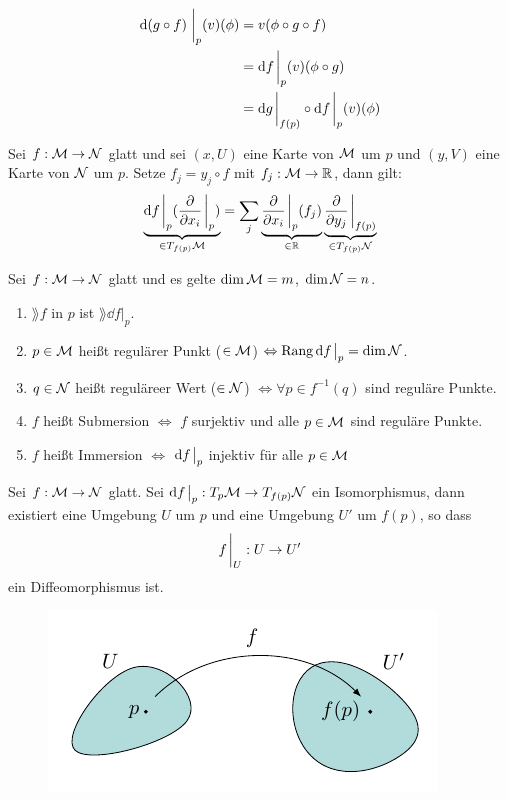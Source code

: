 \begin{bew} \leavevmode
\begin{align}
\dd (g \circ f) \eval_{p} (v) (\phi) &= v(\phi \circ g \circ f) \\
&= \dd f \eval_p (v)(\phi \circ g) \\
&= \dd g \eval_{f(p)} \circ \dd f \eval_p (v) (\phi)
\end{align}
\end{bew}

\begin{satz}
Sei $f: \mathcal{M} \to \mathcal{N}$ glatt und sei $(x, U)$ eine Karte von $\mathcal{M}$ um $p$ und $(y, V)$ eine Karte von $\mathcal{N}$ um $p$.
Setze $f_j = y_j \circ f$ mit $f_j : \mathcal{M} \to \mathbb{R}$, dann gilt:
\begin{align}
\underbrace{\dd f \eval_p ( \pdv{x_i} \eval_p)}_{\in T_{f(p)}\mfk} = \sum_j \underbrace{\pdv{x_i}\eval_p (f_j)}_{\in \R} \underbrace{\pdv{y_j} \eval_{f(p)}}_{\in T_{f(p)}\mfka}
\end{align}
\end{satz}

\begin{defs} 
Sei $f: \mathcal{M} \to \mathcal{N}$ glatt und es gelte $\dim\mathcal{M}=m$, $\dim{\mathcal{N}} = n$.
\begin{enumerate}
\item $\rang f$ in $p$ ist $\rang \dd f \big \vert_p $.
\item $p\in\mathcal{M}$ heißt regulärer Punkt ($\in\mathcal{M}$)  $\Leftrightarrow \rang\dd f \eval_p=\dim\mfka$.
\item $q\in\mathcal{N}$ heißt reguläreer Wert ($\in\mathcal{N}$) $\Leftrightarrow \forall p \in f	^{-1}(q)$ sind reguläre Punkte.
\item $f$ heißt Submersion $\Leftrightarrow$ $f$ surjektiv und alle $p\in\mathcal{M}$ sind reguläre Punkte.
\item $f$ heißt Immersion $\Leftrightarrow$ $\dd f \eval_p$ injektiv für alle $p \in \mathcal{M}$
\end{enumerate}
\end{defs}

\begin{satz}[Umkehrsatz]
\label{satz:Umkehrsatz}
Sei $f: \mathcal{M} \to \mathcal{N}$ glatt. 
Sei $\dd f \eval_p : \tspace{p} \to T_{f(p)}\mfka$ ein Isomorphismus,
dann existiert eine Umgebung $U$ um $p$ und eine Umgebung $U'$ um $f(p)$, so dass
\begin{align}
f\eval_U : U \to U'
\end{align}
ein Diffeomorphismus ist.
\begin{figure}[H]
\centering
\includegraphics[width=0.5\linewidth]{figures/tikz/inverse_function_theorem.pdf}
\label{img:umkehrsatz}
\end{figure} 
\end{satz}

